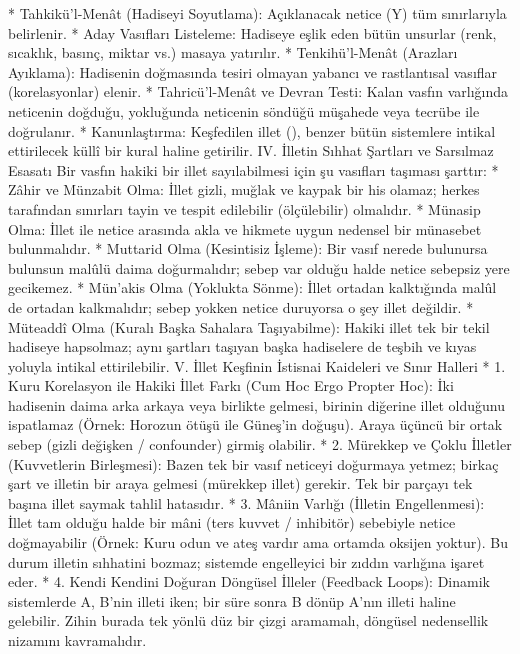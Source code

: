 \documentclass[11pt,a4paper]{article}
\begin{document}
 * Tahkikü'l-Menât (Hadiseyi Soyutlama): Açıklanacak netice (Y) tüm sınırlarıyla belirlenir.
 * Aday Vasıfları Listeleme: Hadiseye eşlik eden bütün unsurlar (renk, sıcaklık, basınç, miktar vs.) masaya yatırılır.
 * Tenkihü'l-Menât (Arazları Ayıklama): Hadisenin doğmasında tesiri olmayan yabancı ve rastlantısal vasıflar (korelasyonlar) elenir.
 * Tahricü'l-Menât ve Devran Testi: Kalan vasfın varlığında neticenin doğduğu, yokluğunda neticenin söndüğü müşahede veya tecrübe ile doğrulanır.
 * Kanunlaştırma: Keşfedilen illet (), benzer bütün sistemlere intikal ettirilecek küllî bir kural haline getirilir.
IV. İlletin Sıhhat Şartları ve Sarsılmaz Esasatı
Bir vasfın hakiki bir illet sayılabilmesi için şu vasıfları taşıması şarttır:
 * Zâhir ve Münzabit Olma: İllet gizli, muğlak ve kaypak bir his olamaz; herkes tarafından sınırları tayin ve tespit edilebilir (ölçülebilir) olmalıdır.
 * Münasip Olma: İllet ile netice arasında akla ve hikmete uygun nedensel bir münasebet bulunmalıdır.
 * Muttarid Olma (Kesintisiz İşleme): Bir vasıf nerede bulunursa bulunsun malûlü daima doğurmalıdır; sebep var olduğu halde netice sebepsiz yere gecikemez.
 * Mün'akis Olma (Yoklukta Sönme): İllet ortadan kalktığında malûl de ortadan kalkmalıdır; sebep yokken netice duruyorsa o şey illet değildir.
 * Müteaddî Olma (Kuralı Başka Sahalara Taşıyabilme): Hakiki illet tek bir tekil hadiseye hapsolmaz; aynı şartları taşıyan başka hadiselere de teşbih ve kıyas yoluyla intikal ettirilebilir.
V. İllet Keşfinin İstisnai Kaideleri ve Sınır Halleri
 * 1. Kuru Korelasyon ile Hakiki İllet Farkı (Cum Hoc Ergo Propter Hoc):
   İki hadisenin daima arka arkaya veya birlikte gelmesi, birinin diğerine illet olduğunu ispatlamaz (Örnek: Horozun ötüşü ile Güneş'in doğuşu). Araya üçüncü bir ortak sebep (gizli değişken / confounder) girmiş olabilir.
 * 2. Mürekkep ve Çoklu İlletler (Kuvvetlerin Birleşmesi):
   Bazen tek bir vasıf neticeyi doğurmaya yetmez; birkaç şart ve illetin bir araya gelmesi (mürekkep illet) gerekir. Tek bir parçayı tek başına illet saymak tahlil hatasıdır.
 * 3. Mâniin Varlığı (İlletin Engellenmesi):
   İllet tam olduğu halde bir mâni (ters kuvvet / inhibitör) sebebiyle netice doğmayabilir (Örnek: Kuru odun ve ateş vardır ama ortamda oksijen yoktur). Bu durum illetin sıhhatini bozmaz; sistemde engelleyici bir zıddın varlığına işaret eder.
 * 4. Kendi Kendini Doğuran Döngüsel İlleler (Feedback Loops):
   Dinamik sistemlerde A, B'nin illeti iken; bir süre sonra B dönüp A'nın illeti haline gelebilir. Zihin burada tek yönlü düz bir çizgi aramamalı, döngüsel nedensellik nizamını kavramalıdır.
\end{document}
